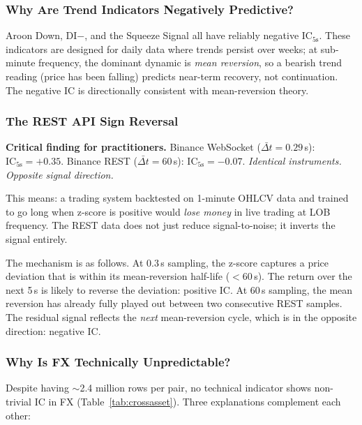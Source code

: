 \documentclass[12pt,a4paper]{article}
\theoremstyle{definition}
\theoremstyle{remark}
\newcommand{\IC}{\mathrm{IC}}
\begin{document}
\subsubsection{Why Are Trend Indicators Negatively Predictive?}

Aroon Down, DI$-$, and the Squeeze Signal all have reliably negative
$\IC_{5\text{s}}$. These indicators are designed for daily data where
trends persist over weeks; at sub-minute frequency, the dominant
dynamic is \emph{mean reversion}, so a bearish trend reading
(price has been falling) predicts near-term recovery, not
continuation. The negative IC is directionally consistent with
mean-reversion theory.

\subsubsection{The REST API Sign Reversal}

\begin{warningbox}
\textbf{Critical finding for practitioners.}
Binance WebSocket ($\bar{\Delta t}=0.29$\,s): $\IC_{5\text{s}}=+0.35$.
Binance REST ($\bar{\Delta t}=60$\,s): $\IC_{5\text{s}}=-0.07$.
\emph{Identical instruments. Opposite signal direction.}

This means: a trading system backtested on 1-minute OHLCV data and
trained to go long when z-score is positive would \emph{lose money}
in live trading at LOB frequency. The REST data does not just reduce
signal-to-noise; it inverts the signal entirely.
\end{warningbox}

The mechanism is as follows. At 0.3\,s sampling, the z-score captures
a price deviation that is within its mean-reversion half-life
($<60$\,s). The return over the next 5\,s is likely to reverse the
deviation: positive IC. At 60\,s sampling, the mean reversion has
already fully played out between two consecutive REST samples. The
residual signal reflects the \emph{next} mean-reversion cycle, which
is in the opposite direction: negative IC.

\subsubsection{Why Is FX Technically Unpredictable?}

Despite having $\sim$2.4 million rows per pair, no technical indicator
shows non-trivial IC in FX (Table~\ref{tab:crossasset}).
Three explanations complement each other:
\end{document}
